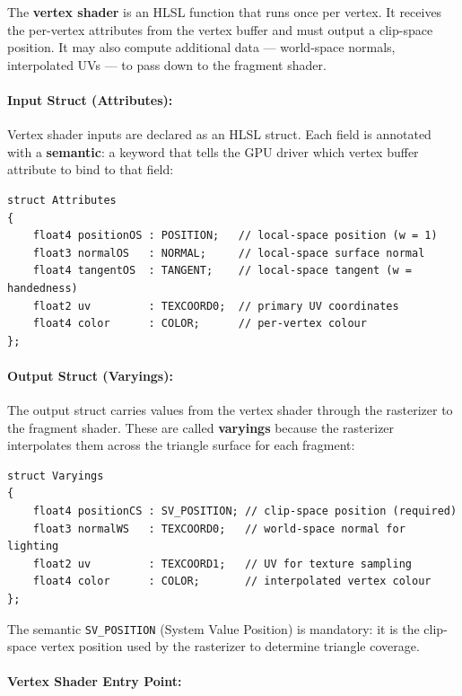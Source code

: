 \documentclass[11pt]{article}
\begin{document}
The \textbf{vertex shader} is an HLSL function that runs once per vertex. It receives the per-vertex attributes from the vertex buffer and must output a clip-space position. It may also compute additional data --- world-space normals, interpolated UVs --- to pass down to the fragment shader.

\paragraph{Input Struct (Attributes):}

Vertex shader inputs are declared as an HLSL struct. Each field is annotated with a \textbf{semantic}: a keyword that tells the GPU driver which vertex buffer attribute to bind to that field:

\begin{lstlisting}
struct Attributes
{
    float4 positionOS : POSITION;   // local-space position (w = 1)
    float3 normalOS   : NORMAL;     // local-space surface normal
    float4 tangentOS  : TANGENT;    // local-space tangent (w = handedness)
    float2 uv         : TEXCOORD0;  // primary UV coordinates
    float4 color      : COLOR;      // per-vertex colour
};
\end{lstlisting}

\paragraph{Output Struct (Varyings):}

The output struct carries values from the vertex shader through the rasterizer to the fragment shader. These are called \textbf{varyings} because the rasterizer interpolates them across the triangle surface for each fragment:

\begin{lstlisting}
struct Varyings
{
    float4 positionCS : SV_POSITION; // clip-space position (required)
    float3 normalWS   : TEXCOORD0;   // world-space normal for lighting
    float2 uv         : TEXCOORD1;   // UV for texture sampling
    float4 color      : COLOR;       // interpolated vertex colour
};
\end{lstlisting}

The semantic \texttt{SV\_POSITION} (System Value Position) is mandatory: it is the clip-space vertex position used by the rasterizer to determine triangle coverage.

\paragraph{Vertex Shader Entry Point:}
\end{document}
